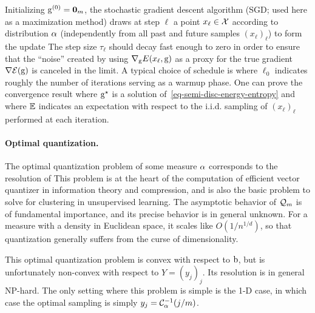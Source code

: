 Initializing $\mathrm{g}^{(0)} = \textbf{0}_{m}$, the stochastic gradient descent algorithm (SGD; used here as a maximization method) draws at step $\ell$ a point $x_\ell \in \mathcal{X}$ according to distribution $\alpha$ (independently from all past and future samples $(x_\ell)_\ell$) to form the update
The step size $\tau_\ell$ should decay fast enough to zero in order to ensure that the ``noise'' created by using  $\nabla_{\mathrm{g}} E(x_\ell,\mathrm{g})$ as a proxy for the true gradient $\nabla \mathcal{E}(\mathrm{g})$ is canceled in the limit. 
%
A typical choice of schedule is 
where $\ell_0$ indicates roughly the number of iterations serving as a warmup phase.
%
One can prove the convergence result
where $\mathrm{g}^\star$ is a solution of~\eqref{eq-semi-disc-energy-entropy} and where $\mathbb{E}$ indicates an expectation with respect to the i.i.d. sampling of $(x_\ell)_\ell$ performed at each iteration.
%


\paragraph{Optimal quantization.}

The optimal quantization problem of some measure $\alpha$ corresponds to the resolution of
This problem is at the heart of the computation of efficient vector quantizer in information theory and compression, and is also the basic problem to solve for clustering in unsupervised learning.
%
The asymptotic behavior of $\mathcal{Q}_m$ is of fundamental importance, and its precise behavior is in general unknown. For a measure with a density in Euclidean space, it scales like $O(1/n^{1/d})$, so that quantization generally suffers from the curse of dimensionality.

This optimal quantization problem is convex with respect to $\mathrm{b}$, but is unfortunately non-convex with respect to $Y=(y_j)_j$. Its resolution is in general NP-hard.
%
The only setting where this problem is simple is the 1-D case, in which case the optimal sampling is simply $y_j = \mathcal{C}_\alpha^{-1}(j/m)$. 

